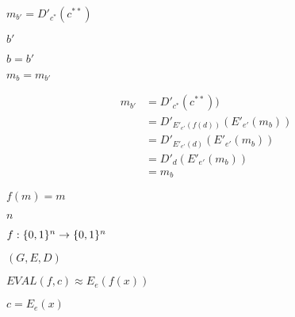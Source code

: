 \documentclass[10pt]{book}
\begin{document}
\begin{mdSnippets}
\begin{mdInlineSnippet}[abdf18031915552ab510326c00b02ab2]
$m_{b'} = D'_{c^*}(c^{**})$\end{mdInlineSnippet}%
\begin{mdInlineSnippet}[2765802181072b3aa2be59dae8c72b0d]%
$b'$\end{mdInlineSnippet}%
\begin{mdInlineSnippet}[2b6e49448e7d732421cbac8655e4f76a]%
$b = b'$\end{mdInlineSnippet}%
\begin{mdInlineSnippet}%
$m_b = m_{b'}$\end{mdInlineSnippet}%
\begin{mdDisplaySnippet}[b49cf0e85ea14f695ca950456652fa3d]%
\[%
\begin{aligned}
m_{b'} &= D'_{c^*}(c^{**})) \\
&= D'_{ E'_{e'}(f(d))}( E'_{e'}(m_b)) \\
&=D'_{ E'_{e'}(d)}( E'_{e'}(m_b)) \\
&=  D'_d( E'_{e'}(m_b)) \\
&= m_b
\end{aligned}
\]%
\end{mdDisplaySnippet}%
\begin{mdInlineSnippet}%
$f(m) = m$\end{mdInlineSnippet}%
\begin{mdInlineSnippet}[7b8b965ad4bca0e41ab51de7b31363a1]%
$n$\end{mdInlineSnippet}%
\begin{mdInlineSnippet}%
$f: \{0,1\}^n \to \{0,1\}^n$\end{mdInlineSnippet}%
\begin{mdInlineSnippet}[b85e5fef323d7d3cb0465e35e6d6d405]%
$(G,E,D)$\end{mdInlineSnippet}%
\begin{mdInlineSnippet}[062e5ca45771416030b21a31f4cd35c5]%
$EVAL(f, c) \approx E_e(f(x))$\end{mdInlineSnippet}%
\begin{mdInlineSnippet}[ff8cd41de300749f17550d72cc2bb5fc]%
$c= E_e(x)$\end{mdInlineSnippet}%
\begin{mdInlineSnippet}[cc927a52f8d88c7f8d09d1be36733f68]%

\end{mdInlineSnippet}
\end{mdSnippets}
\end{document}
